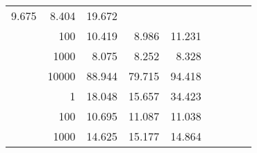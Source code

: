 \begin{table}
\begin{tabular}{rrrrrrrrr}
						
							    
							    
	                           9.675 & 8.404 & 19.672  \\
	                
	            
					 &  
					 
					\multirow{ 1 }{*}{ 100 } &
					
						
							    
							    
	                           10.419 & 8.986 & 11.231  \\
	                
	            
					 &  
					 
					\multirow{ 1 }{*}{ 1000 } &
					
						
							    
							    
	                           8.075 & 8.252 & 8.328  \\
	                
	            
					 &  
					 
					\multirow{ 1 }{*}{ 10000 } &
					
						
							    
							    
	                           88.944 & 79.715 & 94.418  \\
	                
	            
	        
				\noalign{\smallskip}\hline
				\multirow{ 4 }{*}{ 1000000 } &
				
					
					 
					\multirow{ 1 }{*}{ 1 } &
					
						
							    
							    
	                           18.048 & 15.657 & 34.423  \\
	                
	            
					 &  
					 
					\multirow{ 1 }{*}{ 100 } &
					
						
							    
							    
	                           10.695 & 11.087 & 11.038  \\
	                
	            
					 &  
					 
					\multirow{ 1 }{*}{ 1000 } &
					
						
							    
							    
	                           14.625 & 15.177 & 14.864  \\
	                

\end{tabular}
\end{table}
